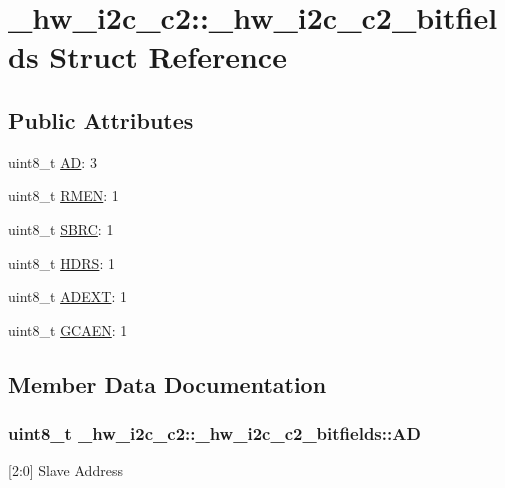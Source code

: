 \hypertarget{struct__hw__i2c__c2_1_1__hw__i2c__c2__bitfields}{}\section{\+\_\+hw\+\_\+i2c\+\_\+c2\+:\+:\+\_\+hw\+\_\+i2c\+\_\+c2\+\_\+bitfields Struct Reference}
\label{struct__hw__i2c__c2_1_1__hw__i2c__c2__bitfields}
\subsection*{Public Attributes}
\begin{DoxyCompactItemize}
\item 
uint8\+\_\+t \hyperlink{struct__hw__i2c__c2_1_1__hw__i2c__c2__bitfields_a4e47c87c86f860bff39715098a824ef5}{AD}\+: 3
\item 
uint8\+\_\+t \hyperlink{struct__hw__i2c__c2_1_1__hw__i2c__c2__bitfields_a807e9baf01208a808214e1718cb3606b}{R\+M\+EN}\+: 1
\item 
uint8\+\_\+t \hyperlink{struct__hw__i2c__c2_1_1__hw__i2c__c2__bitfields_ad37b981d40c2e95f72e16c2838bf3ed3}{S\+B\+RC}\+: 1
\item 
uint8\+\_\+t \hyperlink{struct__hw__i2c__c2_1_1__hw__i2c__c2__bitfields_ac00eb26fa1698ce4a249f6067c2cc359}{H\+D\+RS}\+: 1
\item 
uint8\+\_\+t \hyperlink{struct__hw__i2c__c2_1_1__hw__i2c__c2__bitfields_a88c92ceed5f2346eeef47025f4baea72}{A\+D\+E\+XT}\+: 1
\item 
uint8\+\_\+t \hyperlink{struct__hw__i2c__c2_1_1__hw__i2c__c2__bitfields_a835e66c2bc4407024fe4bfbb06b7c9ed}{G\+C\+A\+EN}\+: 1
\end{DoxyCompactItemize}


\subsection{Member Data Documentation}
\subsubsection[{\texorpdfstring{AD}{AD}}]{\setlength{\rightskip}{0pt plus 5cm}uint8\+\_\+t \+\_\+hw\+\_\+i2c\+\_\+c2\+::\+\_\+hw\+\_\+i2c\+\_\+c2\+\_\+bitfields\+::\+AD}\hypertarget{struct__hw__i2c__c2_1_1__hw__i2c__c2__bitfields_a4e47c87c86f860bff39715098a824ef5}{}\label{struct__hw__i2c__c2_1_1__hw__i2c__c2__bitfields_a4e47c87c86f860bff39715098a824ef5}
\mbox{[}2\+:0\mbox{]} Slave Address 
